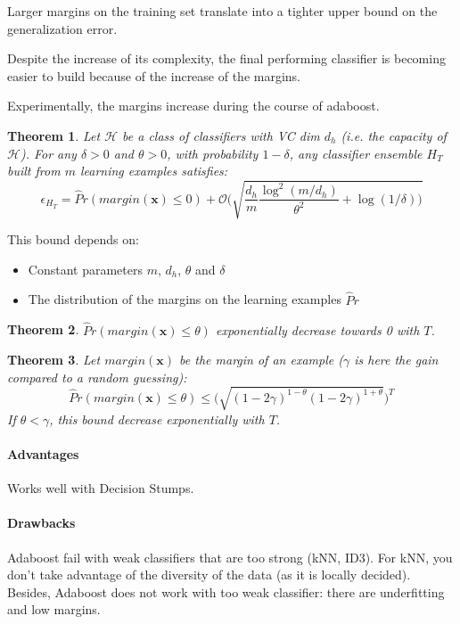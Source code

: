 \documentclass{article}
\newtheorem{thm}{Theorem}
\begin{document}
Larger margins on the training set translate into a tighter upper bound on the generalization error.


Despite the increase of its complexity, the final performing classifier is becoming easier to build because of the increase of the margins.
\bigskip

Experimentally, the margins increase during the course of adaboost.

\begin{thm}
Let $\mathcal{H}$ be a class of classifiers with VC dim $d_h$ (i.e. the capacity of $\mathcal{H}$). For any $\delta > 0$ and $\theta > 0$, with probability $1-\delta$, any classifier ensemble $H_T$ built from $m$ learning examples satisfies:
\[\epsilon_{H_T}=\hat{P}r(margin(\mathbf{x})\leq 0)+ \mathcal{O}\Big( \sqrt{\dfrac{d_h}{m}\dfrac{\log^2 (m/d_h)}{\theta^2}+\log(1/\delta)\Big)}\]
\end{thm}

This bound depends on:
\begin{itemize}[noitemsep]
\item Constant parameters $m$, $d_h$, $\theta$ and $\delta$
\item The distribution of the margins on the learning examples $\hat{P}r$
\end{itemize}

\begin{thm}
$\hat{P}r(margin(\mathbf{x})\leq \theta)$ exponentially decrease towards 0 with $T$.
\end{thm}

\begin{thm}
Let $margin(\mathbf{x})$ be the margin of an example ($\gamma$ is here the gain compared to a random guessing):
\[\hat{P}r(margin(\mathbf{x})\leq \theta)\leq \big( \sqrt{(1-2\gamma)^{1-\theta}(1-2\gamma)^{1+\theta}}\big)^T\]
If $\theta<\gamma$, this bound decrease exponentially with $T$.
\end{thm}


\paragraph{Advantages}
Works well with Decision Stumps.

\paragraph{Drawbacks}
Adaboost fail with weak classifiers that are too strong (kNN, ID3). For kNN, you don't take advantage of the diversity of the data (as it is locally decided). Besides, Adaboost does not work with too weak classifier: there are underfitting and low margins.
\end{document}
